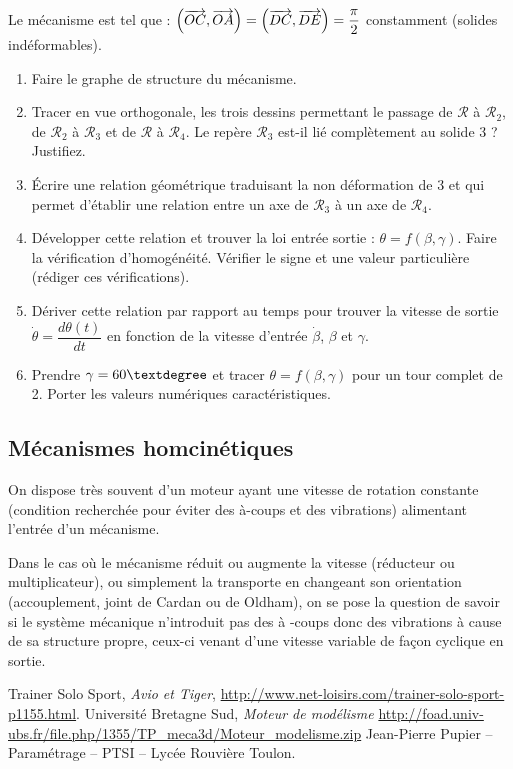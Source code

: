 \documentclass[10pt,oneside]{article}
\begin{document}
\begin{exemple}
Le mécanisme est tel que : $\left( \overrightarrow{OC},\overrightarrow{OA}\right) = \left( \overrightarrow{DC},\overrightarrow{DE}\right)=\dfrac{\pi}{2} $  constamment (solides indéformables).
\begin{enumerate}
\item Faire le graphe de structure du mécanisme.
\item Tracer en vue orthogonale, les trois dessins permettant le passage de $\mathcal{R}$ à $\mathcal{R}_2$, de $\mathcal{R}_2$  à $\mathcal{R}_3$ et de $\mathcal{R}$  à $\mathcal{R}_4$. Le repère $\mathcal{R}_3$ est-il lié complètement au solide 3 ? Justifiez.
\item Écrire une relation géométrique traduisant la non déformation de 3 et qui permet d'établir une relation entre un axe de $\mathcal{R}_3$  à un axe de $\mathcal{R}_4$.
\item Développer cette relation et trouver la loi entrée sortie : $\theta = f(\beta , \gamma)$. Faire la vérification d'homogénéité. Vérifier le signe et une valeur particulière (rédiger ces vérifications).
\item Dériver cette relation par rapport au temps pour trouver la vitesse de sortie  $\dot{\theta}=\dfrac{d\theta(t)}{dt}$ en fonction de la vitesse d'entrée $\dot{\beta}$, $\beta$ et $\gamma$.
\item Prendre $\gamma= 60\textdegree$ et tracer $\theta = f(\beta, \gamma)$ pour un tour complet de 2. Porter les valeurs numériques caractéristiques.
\end{enumerate}

\end{exemple}

\subsection{Mécanismes homcinétiques}
On dispose très souvent d'un moteur ayant une vitesse de rotation constante (condition recherchée pour éviter des à-coups et des vibrations) alimentant l'entrée d'un mécanisme.

Dans le cas où le mécanisme réduit ou augmente la vitesse (réducteur ou multiplicateur), ou simplement la transporte en changeant son orientation (accouplement, joint de Cardan ou de Oldham), on se pose la question de savoir si le système mécanique n'introduit pas des à -coups donc des vibrations à cause de sa structure propre, ceux-ci venant d'une vitesse variable de façon cyclique en sortie.



\begin{thebibliography}{2}
 Trainer Solo Sport, \textit{Avio et Tiger}, \url{http://www.net-loisirs.com/trainer-solo-sport-p1155.html}.
 Université Bretagne Sud, \textit{Moteur de modélisme} \url{http://foad.univ-ubs.fr/file.php/1355/TP_meca3d/Moteur_modelisme.zip}
 Jean-Pierre Pupier -- Paramétrage -- PTSI -- Lycée Rouvière Toulon.
\end{thebibliography}
\end{document}
